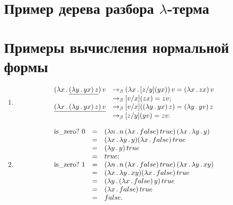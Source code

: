 \documentclass[12pt,a4paper]{article}
\begin{document}
\section*{Пример дерева разбора $\lambda$-терма}

\begin{center}
\end{center}

\section*{Примеры вычисления нормальной формы}
\begin{enumerate}
\item 
\[
\begin{array}{ll}
  (\lambda x\,.\, \underline{(\lambda y\,.\, yx)\,z})\,v &\rightarrow_\beta (\lambda x\,.\, [z/y](yx))\,v = (\lambda x\,.\, zx)\,v\\
  	&\rightarrow_\beta [v/x](zx)=zv;\\
 \underline{(\lambda x\,.\, (\lambda y\,.\, yx)\,z)\,v} &\rightarrow_\beta [v/x]((\lambda y\,.\, yx)\,z) = (\lambda y\,.\, yv)\,z\\
  	&\rightarrow_\beta [z/y](yv)=zv.
\end{array}
\]
\item 
\[
\begin{array}{lcl}
  \mathrm{is\_zero?}\ 0 &=& (\lambda n\,.\, n\,(\lambda x\,.\, false)\,true)\,(\lambda x\,.\,\lambda y\,.\, y)\\
  	&=& (\lambda x\,.\,\lambda y\,.\, y) (\lambda x\,.\, false)\,true\\
  	&=& (\lambda y\,.\, y)\, true\\
  	&=& true;\\
  \mathrm{is\_zero?}\ 1 &=& (\lambda n\,.\, n\,(\lambda x\,.\, false)\,true)\,(\lambda x\,.\,\lambda y\,.\, xy)\\
    &=& (\lambda x\,.\,\lambda y\,.\, xy) (\lambda x\,.\, false)\,true\\
  	&=& (\lambda y\,.\, (\lambda x\,.\, false)\,y)\, true\\
  	&=& (\lambda x\,.\, false)\, true\\
  	&=& false.  	
\end{array}
\]
\end{enumerate}
\end{document}
